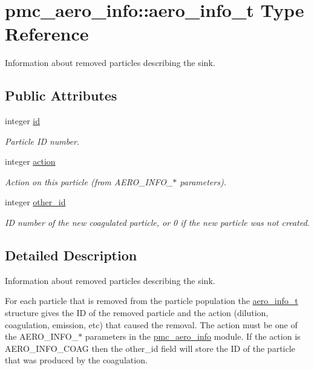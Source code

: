 \hypertarget{structpmc__aero__info_1_1aero__info__t}{}\section{pmc\+\_\+aero\+\_\+info\+:\+:aero\+\_\+info\+\_\+t Type Reference}
\label{structpmc__aero__info_1_1aero__info__t}


Information about removed particles describing the sink.  


\subsection*{Public Attributes}
\begin{DoxyCompactItemize}
\item 
integer \mbox{\hyperlink{structpmc__aero__info_1_1aero__info__t_a952ee41af2ab709e5d15827492f7433c}{id}}
\begin{DoxyCompactList}\small\item\em Particle ID number. \end{DoxyCompactList}\item 
integer \mbox{\hyperlink{structpmc__aero__info_1_1aero__info__t_adf0e46de86eaf1af56c1745a6c15cd9d}{action}}
\begin{DoxyCompactList}\small\item\em Action on this particle (from A\+E\+R\+O\+\_\+\+I\+N\+F\+O\+\_\+$\ast$ parameters). \end{DoxyCompactList}\item 
integer \mbox{\hyperlink{structpmc__aero__info_1_1aero__info__t_a8609952c4bb522fa2315726ece137680}{other\+\_\+id}}
\begin{DoxyCompactList}\small\item\em ID number of the new coagulated particle, or 0 if the new particle was not created. \end{DoxyCompactList}\end{DoxyCompactItemize}


\subsection{Detailed Description}
Information about removed particles describing the sink. 

For each particle that is removed from the particle population the \mbox{\hyperlink{structpmc__aero__info_1_1aero__info__t}{aero\+\_\+info\+\_\+t}} structure gives the ID of the removed particle and the action (dilution, coagulation, emission, etc) that caused the removal. The action must be one of the A\+E\+R\+O\+\_\+\+I\+N\+F\+O\+\_\+$\ast$ parameters in the \mbox{\hyperlink{namespacepmc__aero__info}{pmc\+\_\+aero\+\_\+info}} module. If the action is A\+E\+R\+O\+\_\+\+I\+N\+F\+O\+\_\+\+C\+O\+AG then the other\+\_\+id field will store the ID of the particle that was produced by the coagulation.

